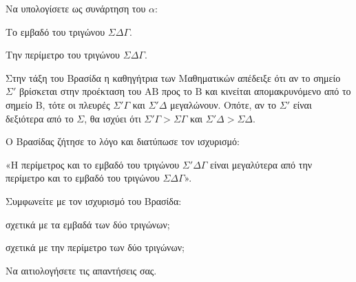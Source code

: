 \begin{alist}
    \item Να υπολογίσετε ως συνάρτηση του $\alpha$:
    \begin{rlist}
        \item Το εμβαδό του τριγώνου $\Sigma\Delta\Gamma$.
        \item Την περίμετρο του τριγώνου $\Sigma\Delta\Gamma$. 
    \end{rlist}
    \item Στην τάξη του Βρασίδα η καθηγήτρια των Μαθηματικών απέδειξε ότι αν το σημείο $\Sigma'$ βρίσκεται στην προέκταση του $\mathrm{AB}$ προς το $\mathrm{B}$ και κινείται απομακρυνόμενο από το σημείο $\mathrm{B}$, τότε οι πλευρές $\Sigma'\Gamma$ και $\Sigma'\Delta$ μεγαλώνουν. Οπότε, αν το $\Sigma'$ είναι δεξιότερα από το $\Sigma$, θα ισχύει ότι $\Sigma'\Gamma > \Sigma\Gamma$ και $\Sigma'\Delta > \Sigma\Delta$.
    
    Ο Βρασίδας ζήτησε το λόγο και διατύπωσε τον ισχυρισμό:
    
    «Η περίμετρος και το εμβαδό του τριγώνου $\Sigma'\Delta\Gamma$ είναι μεγαλύτερα από την περίμετρο και το εμβαδό του τριγώνου $\Sigma\Delta\Gamma$».
    
    Συμφωνείτε με τον ισχυρισμό του Βρασίδα:
    \begin{rlist}
        \item σχετικά με τα εμβαδά των δύο τριγώνων; 
        \item σχετικά με την περίμετρο των δύο τριγώνων; 
    \end{rlist}
    Να αιτιολογήσετε τις απαντήσεις σας.
\end{alist}